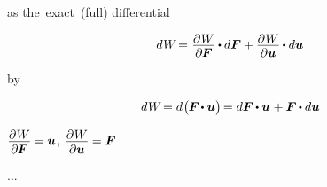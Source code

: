 as the~exact~(full) differential

\nopagebreak\[
d \hspace{.1ex} W \hspace{-0.33ex}  = \hspace{.08ex} \displaystyle \frac{\raisemath{-0.2em}{\partial \hspace{.1ex} W}}{\partial \hspace{-0.1ex} \bm{F}} \hspace{-0.1ex} \dotp d \bm{F} + \frac{\raisemath{-0.2em}{\partial \hspace{.1ex} W}}{\partial \bm{u}} \hspace{-0.1ex} \dotp d \bm{u}
\]

by 

\nopagebreak\[
d \hspace{.1ex} W \hspace{-0.33ex}
= d \hspace{.15ex} \bigl( \hspace{-0.1ex} \bm{F} \hspace{-0.2ex} \dotp \bm{u} \bigr) \hspace{-0.25ex}
= d\bm{F} \hspace{-0.1ex} \dotp \bm{u} \hspace{.12ex} + \bm{F} \hspace{-0.1ex} \dotp d\bm{u}
\]

${\displaystyle \frac{\raisemath{-0.2em}{\partial \hspace{.1ex} W}}{\partial \hspace{-0.1ex} \bm{F}} \hspace{-0.1ex} = \bm{u}}$,
${\displaystyle \frac{\raisemath{-0.2em}{\partial \hspace{.1ex} W}}{\partial \bm{u}} \hspace{-0.1ex} = \bm{F}}$

...

